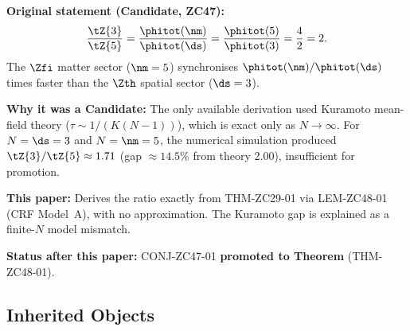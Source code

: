 \documentclass[12pt, a4paper]{article}
\begin{document}
\begin{keybox}[title={CONJ-ZC47-01 (ZC47) --- Now Promoted}]
\textbf{Original statement (Candidate, ZC47):}
\[
  \frac{\tZ{3}}{\tZ{5}}
  = \frac{\phitot(\nm)}{\phitot(\ds)}
  = \frac{\phitot(5)}{\phitot(3)} = \frac{4}{2} = 2.
\]
The $\Zfi$ matter sector ($\nm = 5$) synchronises
$\phitot(\nm)/\phitot(\ds)$ times faster than the
$\Zth$ spatial sector ($\ds = 3$).

\textbf{Why it was a Candidate:}
The only available derivation used Kuramoto mean-field theory
($\tau \sim 1/(K(N-1))$), which is exact only as $N\to\infty$.
For $N = \ds = 3$ and $N = \nm = 5$, the numerical simulation
produced $\tZ{3}/\tZ{5} \approx 1.71$ (gap $\approx 14.5\%$
from theory 2.00), insufficient for promotion.

\textbf{This paper:}
Derives the ratio exactly from THM-ZC29-01 via LEM-ZC48-01
(CRF Model~A), with no approximation.
The Kuramoto gap is explained as a finite-$N$ model mismatch.

\textbf{Status after this paper:} CONJ-ZC47-01
\textbf{promoted to Theorem} (THM-ZC48-01).
\end{keybox}

\subsection{Inherited Objects}
\label{sec:inherited}

\end{document}
